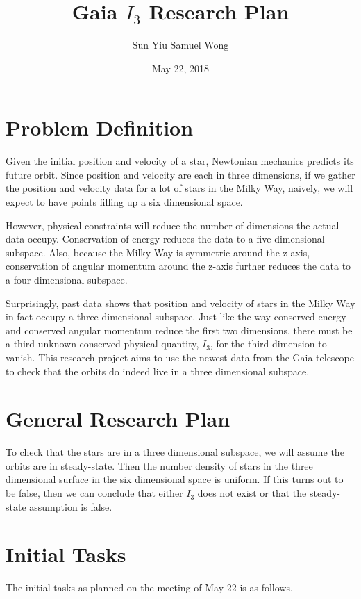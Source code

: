 \documentclass[12pt]{article}
\begin{document}
\title{Gaia $I_3$ Research Plan}
\author{Sun Yiu Samuel Wong}
\date{May 22, 2018}
\maketitle

\section{Problem Definition}
Given the initial position and velocity of a star, Newtonian mechanics predicts its future orbit. Since position and velocity are each in three dimensions, if we gather the position and velocity data for a lot of stars in the Milky Way, naively, we will expect to have points filling up a six dimensional space.

However, physical constraints will reduce the number of dimensions the actual data occupy. Conservation of energy reduces the data to a five dimensional subspace. Also, because the Milky Way is symmetric around the z-axis, conservation of angular momentum around the z-axis further reduces the data to a four dimensional subspace.

Surprisingly, past data shows that position and velocity of stars in the Milky Way in fact occupy a three dimensional subspace. Just like the way conserved energy and conserved angular momentum reduce the first two dimensions, there must be a third unknown conserved physical quantity, $I_3$, for the third dimension to vanish. This research project aims to use the newest data from the Gaia telescope to check that the orbits do indeed live in a three dimensional subspace.

\section{General Research Plan}
To check that the stars are in a three dimensional subspace, we will assume the orbits are in steady-state. Then the number density of stars in the three dimensional surface in the six dimensional space is uniform. If this turns out to be false, then we can conclude that either $I_3$ does not exist or that the steady-state assumption is false.

\section{Initial Tasks}
The initial tasks as planned on the meeting of May 22 is as follows.
\end{document}

